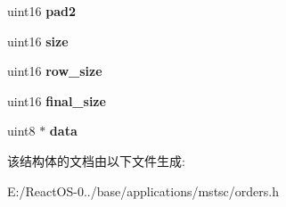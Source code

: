 \begin{DoxyCompactItemize}
\mbox{\label{struct___r_d_p___b_m_p_c_a_c_h_e___o_r_d_e_r_a2dc576465374f2d5ce12ea60fdcfa6af}} 
uint16 {\bfseries pad2}
\item 
\mbox{\label{struct___r_d_p___b_m_p_c_a_c_h_e___o_r_d_e_r_adc0e5c28702bac9d2e74394c376c3314}} 
uint16 {\bfseries size}
\item 
\mbox{\label{struct___r_d_p___b_m_p_c_a_c_h_e___o_r_d_e_r_a852d10d550c5c79183efd239dcf16c6e}} 
uint16 {\bfseries row\+\_\+size}
\item 
\mbox{\label{struct___r_d_p___b_m_p_c_a_c_h_e___o_r_d_e_r_af0280816eb264c37b2097eb736587ef1}} 
uint16 {\bfseries final\+\_\+size}
\item 
\mbox{\label{struct___r_d_p___b_m_p_c_a_c_h_e___o_r_d_e_r_a5aef819d8198ef43a88598c9d6363d9a}} 
uint8 $\ast$ {\bfseries data}
\end{DoxyCompactItemize}


该结构体的文档由以下文件生成\+:\begin{DoxyCompactItemize}
\item 
E\+:/\+React\+O\+S-\/0../base/applications/mstsc/orders.\+h\end{DoxyCompactItemize}

